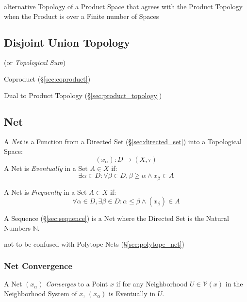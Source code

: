 alternative Topology of a Product Space that agrees with the Product Topology
when the Product is over a Finite number of Spaces



\subsection{Disjoint Union Topology}\label{sec:disjoint_union_topology}

(or \emph{Topological Sum})

Coproduct (\S\ref{sec:coproduct})

Dual to Product Topology (\S\ref{sec:product_topology})



\subsection{Net}\label{sec:net}

A \emph{Net} is a Function from a Directed Set (\S\ref{sec:directed_set}) into
a Topological Space:
\[
  (x_\alpha) : D \rightarrow (X, \tau)
\]
A Net is \emph{Eventually} in a Set $A \in X$ if:
\[
  \exists \alpha \in D
  : \forall \beta \in D, \beta \geq \alpha \wedge x_\beta \in A
\]

A Net is \emph{Frequently} in a Set $A \in X$ if:
\[
  \forall \alpha \in D, \exists \beta \in D
  : \alpha \leq \beta \wedge (x_\beta) \in A
\]

A Sequence (\S\ref{sec:sequence}) is a Net where the Directed Set is the
Natural Numbers $\mathbb{N}$.

\fist not to be confused with Polytope Nets (\S\ref{sec:polytope_net})



\subsubsection{Net Convergence}\label{sec:net_convergence}

A Net $(x_\alpha)$ \emph{Converges} to a Point $x$ if for any
Neighborhood $U \in \mathcal{V}(x)$ in the Neighborhood System of $x$,
$(x_\alpha)$ is Eventually in $U$.



